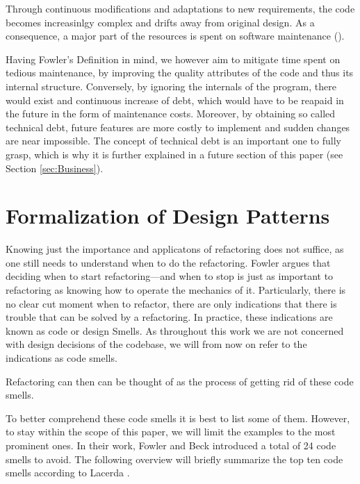 Through continuous modifications and adaptations to new requirements, the code becomes increasinlgy complex and drifts away from original design. 
As a consequence, 
	a major part of the resources is spent on software maintenance (\cite[p.~1]{mens2003}). 

Having Fowler's Definition in mind, 
	we however aim to mitigate time spent on tedious maintenance, 
	by improving the quality attributes of the code and thus its internal structure.
Conversely, by ignoring the internals of the program, 
	there would exist and continuous increase of debt, 
	which would have to be reapaid in the future in the form of maintenance costs.
Moreover, by obtaining so called technical debt, 
	future features are more costly to implement and sudden changes are near impossible. 
The concept of technical debt is an important one to fully grasp, 
	which is why it is further explained in a future section of this paper 
(see Section \ref{sec:Business}).
	



\section{Formalization of Design Patterns}

Knowing just the importance and applicatons of refactoring does not suffice, 
	as one still needs to understand when to do the refactoring.
Fowler \textcite{fowler2018} argues that deciding when to start refactoring—and when to stop 
	is just as important to refactoring as knowing how to operate the mechanics of it.
Particularly, there is no clear cut moment when to refactor, 
	there are only indications that there is trouble that can be solved by a refactoring.
In practice, these indications are known as code or design Smells.
As throughout this work we are not concerned with design decisions of the codebase, 
	we will from now on refer to the indications as code smells.

Refactoring can then can be thought of as the process of getting rid of these code smells. 

To better comprehend these code smells it is best to list some of them. 
However, to stay within the scope of this paper, 
	we will limit the examples to the most prominent ones. 
In their work, Fowler and Beck introduced a total of 24 code smells to avoid.
The following overview will briefly summarize the top ten code smells according to Lacerda \textcite{lacerda2020}.

